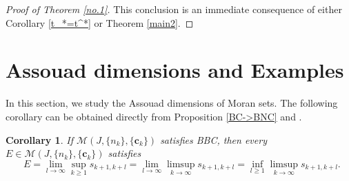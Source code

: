 \documentclass[12pt]{amsart}
\numberwithin{equation}{section}
\theoremstyle{plain}
\newtheorem{corollary}[theorem]{Corollary}
\theoremstyle{remark}
\theoremstyle{definition}
\newcommand{\ccc}{\mathbf{c}}
\renewcommand{\ge}{\geqslant}
\DeclareMathOperator{\dima}{dim_A}
\begin{document}
	\begin{proof}[Proof of Theorem \ref{no.1}]
		This conclusion is an immediate consequence of either Corollary \ref{t_*=t^*} or Theorem \ref{main2}.
	\end{proof}
	
	
	
	
	\section{Assouad dimensions and Examples}\label{Sec_ADE}
	
	In this section, we study the Assouad dimensions of Moran sets.
The following corollary can be obtained directly from Proposition \ref{BC->BNC} and \cite[Theorem A]{kaenmaki2024regularity}.

	\begin{corollary}\label{cor_AD}
If $\mathcal{M}(J,\{n_k\},\{\ccc_k\})$  satisfies BBC, then every $E\in\mathcal{M}(J,\{n_k\},\{\ccc_k\})$ satisfies
		\[
		\dima E =\lim_{l\to\infty}\sup_{k\ge 1} s_{k+1,k+l}=\lim_{l\to\infty}\limsup_{k\to\infty}s_{k+1,k+l}=\inf_{l\ge 1}\limsup_{k\to\infty}s_{k+1,k+l}.
		\]
	\end{corollary}
\end{document}
